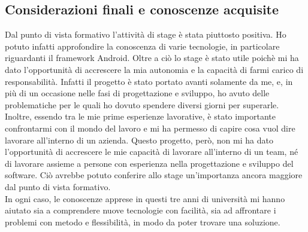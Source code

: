 \documentclass[../Tesi.tex]{subfiles}
\begin{document}
	\subsection{Considerazioni finali e conoscenze acquisite}
	Dal punto di vista formativo l'attività di stage è stata piuttosto positiva. Ho potuto infatti approfondire la conoscenza di varie tecnologie, in particolare riguardanti il framework Android. Oltre a ciò lo stage è stato utile poichè mi ha dato l'opportunità di accrescere la mia autonomia e la capacità di farmi carico di responsabilità. Infatti il progetto è stato portato avanti solamente da me, e, in più di un occasione nelle fasi di progettazione e sviluppo, ho avuto delle problematiche per le quali ho dovuto spendere diversi giorni per superarle. Inoltre, essendo tra le mie prime esperienze lavorative, è stato importante confrontarmi con il mondo del lavoro e mi ha permesso di capire cosa vuol dire lavorare all'interno di un azienda. Questo progetto, però, non mi ha dato l'opportunità di accrescere le mie capacità di lavorare all'interno di un team, né di lavorare assieme a persone con esperienza nella progettazione e sviluppo del software. Ciò avrebbe potuto conferire allo stage un'importanza ancora maggiore dal punto di vista formativo.\\
	In ogni caso, le conoscenze apprese in questi tre anni di università mi hanno aiutato sia a comprendere nuove tecnologie con facilità, sia ad affrontare i problemi con metodo e flessibilità, in modo da poter trovare una soluzione. 
\end{document}
